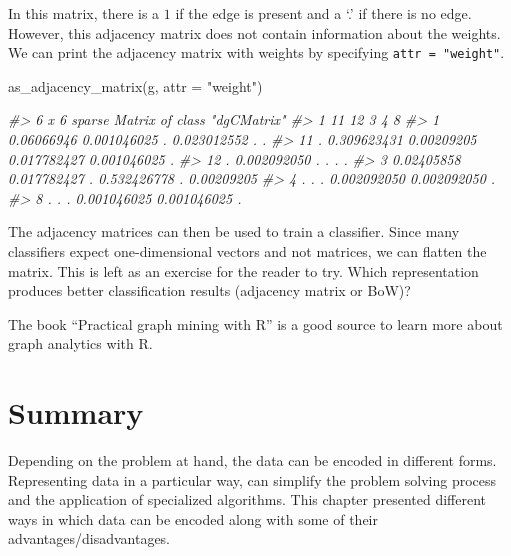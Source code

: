 \documentclass[
  11pt,
]{krantz}
\makeatletter
\newenvironment{Shaded}{\begin{snugshade}}{\end{snugshade}}
\newcommand{\AttributeTok}[1]{\textcolor[rgb]{0.61,0.61,0.61}{#1}}
\newcommand{\CommentTok}[1]{\textcolor[rgb]{0.37,0.37,0.37}{\textit{#1}}}
\newcommand{\FunctionTok}[1]{\textcolor[rgb]{0,0,0}{#1}}
\newcommand{\NormalTok}[1]{#1}
\newcommand{\StringTok}[1]{\textcolor[rgb]{0.5,0.5,0.5}{#1}}
\newenvironment{kframe}{%
\medskip{}
\setlength{\fboxsep}{.8em}
 \def\at@end@of@kframe{}%
 \ifinner\ifhmode%
  \def\at@end@of@kframe{\end{minipage}}%
  \begin{minipage}{\columnwidth}%
 \fi\fi%
 \def\FrameCommand##1{\hskip\@totalleftmargin \hskip-\fboxsep
 \colorbox{shadecolor}{##1}\hskip-\fboxsep
     \hskip-\linewidth \hskip-\@totalleftmargin \hskip\columnwidth}%
 \MakeFramed {\advance\hsize-\width
   \@totalleftmargin\z@ \linewidth\hsize
   \@setminipage}}%
 {\par\unskip\endMakeFramed%
 \at@end@of@kframe}
\newenvironment{rmdblock}[1]
  {
  \begin{itemize}
  \renewcommand{\labelitemi}{
    \raisebox{-.7\height}[0pt][0pt]{
      {\setkeys{Gin}{width=3em,keepaspectratio}\texttt{[image: images/icons/\#1]}}
    }
  }
  \setlength{\fboxsep}{1em}
  \begin{kframe}
  \item
  }
  {
  \end{kframe}
  \end{itemize}
  }
\newenvironment{rmdinfo}
  {\begin{rmdblock}{info}}
  {\end{rmdblock}}
\makeatother
\begin{document}
In this matrix, there is a \(1\) if the edge is present and a `.' if there is no edge. However, this adjacency matrix does not contain information about the weights. We can print the adjacency matrix with weights by specifying \texttt{attr\ =\ "weight"}.

\begin{Shaded}
\begin{Highlighting}[]
\FunctionTok{as\_adjacency\_matrix}\NormalTok{(g, }\AttributeTok{attr =} \StringTok{"weight"}\NormalTok{)}

\CommentTok{\#\textgreater{} 6 x 6 sparse Matrix of class "dgCMatrix"}
\CommentTok{\#\textgreater{}             1          11         12           3           4          8}
\CommentTok{\#\textgreater{} 1  0.06066946 0.001046025 .          0.023012552 .           .         }
\CommentTok{\#\textgreater{} 11 .          0.309623431 0.00209205 0.017782427 0.001046025 .         }
\CommentTok{\#\textgreater{} 12 .          0.002092050 .          .           .           .         }
\CommentTok{\#\textgreater{} 3  0.02405858 0.017782427 .          0.532426778 .           0.00209205}
\CommentTok{\#\textgreater{} 4  .          .           .          0.002092050 0.002092050 .         }
\CommentTok{\#\textgreater{} 8  .          .           .          0.001046025 0.001046025 .    }
\end{Highlighting}
\end{Shaded}

The adjacency matrices can then be used to train a classifier. Since many classifiers expect one-dimensional vectors and not matrices, we can flatten the matrix. This is left as an exercise for the reader to try. Which representation produces better classification results (adjacency matrix or BoW)?

\begin{rmdinfo}
The book ``Practical graph mining with R'' \citep{samatova2013} is a good source to learn more about graph analytics with R.
\end{rmdinfo}

\hypertarget{SummaryRepresentations}{%
\section{Summary}\label{SummaryRepresentations}}

Depending on the problem at hand, the data can be encoded in different forms. Representing data in a particular way, can simplify the problem solving process and the application of specialized algorithms. This chapter presented different ways in which data can be encoded along with some of their advantages/disadvantages.
\end{document}
